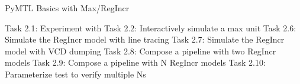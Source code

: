 %
%
%
%
%

\begin{frame}{ PyMTL Basics with Max/RegIncr}
\begin{cbxlist}
  \1 Task 2.1: Experiment with 
  \1 Task 2.2: Interactively simulate a max unit
  \1 
  \1 
  \1 
  \1 Task 2.6: Simulate the RegIncr model with line tracing
  \1 Task 2.7: Simulate the RegIncr model with VCD dumping
  \1 Task 2.8: Compose a pipeline with two RegIncr models
  \1 Task 2.9: Compose a pipeline with N RegIncr models
  \1 Task 2.10: Parameterize test to verify multiple Ns
\end{cbxlist}
\end{frame}

